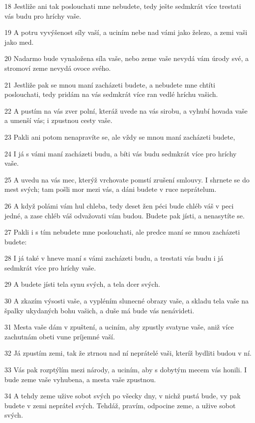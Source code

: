 \par 18 Jestliže ani tak poslouchati mne nebudete, tedy ješte sedmkrát více trestati vás budu pro hríchy vaše.
\par 19 A potru vyvýšenost síly vaší, a uciním nebe nad vámi jako železo, a zemi vaši jako med.
\par 20 Nadarmo bude vynaložena síla vaše, nebo zeme vaše nevydá vám úrody své, a stromoví zeme nevydá ovoce svého.
\par 21 Jestliže pak se mnou maní zacházeti budete, a nebudete mne chtíti poslouchati, tedy pridám na vás sedmkrát více ran vedlé hríchu vašich.
\par 22 A pustím na vás zver polní, kteráž uvede na vás sirobu, a vyhubí hovada vaše a umenší vás; i zpustnou cesty vaše.
\par 23 Pakli ani potom nenapravíte se, ale vždy se mnou maní zacházeti budete,
\par 24 I já s vámi maní zacházeti budu, a bíti vás budu sedmkrát více pro hríchy vaše.
\par 25 A uvedu na vás mec, kterýž vrchovate pomstí zrušení smlouvy. I shrnete se do mest svých; tam pošli mor mezi vás, a dáni budete v ruce neprátelum.
\par 26 A když polámi vám hul chleba, tedy deset žen péci bude chléb váš v peci jedné, a zase chléb váš odvažovati vám budou. Budete pak jísti, a nenasytíte se.
\par 27 Pakli i s tím nebudete mne poslouchati, ale predce maní se mnou zacházeti budete:
\par 28 I já také v hneve maní s vámi zacházeti budu, a trestati vás budu i já sedmkrát více pro hríchy vaše.
\par 29 A budete jísti tela synu svých, a tela dcer svých.
\par 30 A zkazím výsosti vaše, a vypléním slunecné obrazy vaše, a skladu tela vaše na špalky ukydaných bohu vašich, a duše má bude vás nenávideti.
\par 31 Mesta vaše dám v zpuštení, a uciním, aby zpustly svatyne vaše, aniž více zachutnám obeti vune príjemné vaší.
\par 32 Já zpustím zemi, tak že ztrnou nad ní neprátelé vaši, kteríž bydliti budou v ní.
\par 33 Vás pak rozptýlím mezi národy, a uciním, aby s dobytým mecem vás honili. I bude zeme vaše vyhubena, a mesta vaše zpustnou.
\par 34 A tehdy zeme užive sobot svých po všecky dny, v nichž pustá bude, vy pak budete v zemi neprátel svých. Tehdáž, pravím, odpocine zeme, a užive sobot svých.
